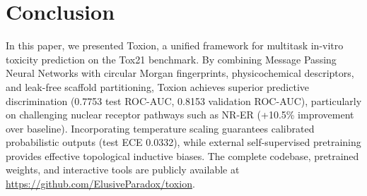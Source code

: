 \documentclass[conference]{IEEEtran}
\begin{document}
\section{Conclusion}
In this paper, we presented Toxion, a unified framework for multitask in-vitro toxicity prediction on the Tox21 benchmark. By combining Message Passing Neural Networks with circular Morgan fingerprints, physicochemical descriptors, and leak-free scaffold partitioning, Toxion achieves superior predictive discrimination (0.7753 test ROC-AUC, 0.8153 validation ROC-AUC), particularly on challenging nuclear receptor pathways such as NR-ER (+10.5\% improvement over baseline). Incorporating temperature scaling guarantees calibrated probabilistic outputs (test ECE 0.0332), while external self-supervised pretraining provides effective topological inductive biases. The complete codebase, pretrained weights, and interactive tools are publicly available at \url{https://github.com/ElusiveParadox/toxion}.
\end{document}
